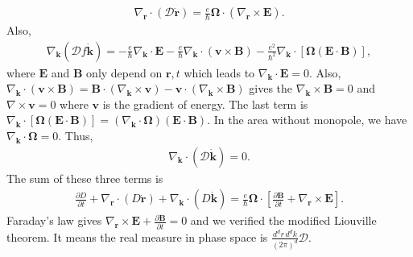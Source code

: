 \documentclass[12pt, oneside]{article}
\newcommand{\pa}{\partial}
\newcommand{\p}[1]{\left(#1\right)}
\newcommand{\bb}[1]{\left[#1\right]}
\numberwithin{equation}{subsection}
\begin{document}
\begin{align}
	\nabla_{\bm r}\cdot(\mathcal{D} \dot{\bm r}) = \frac{e}{\hbar} \bm\Omega\cdot(\nabla_{\bm r}\times\bm E).
\end{align}
Also, 
\begin{align}
	\nabla_{\bm{k}} \p{\mathcal{D} f \dot{\bm{k}}}  = - \frac{e}{\hbar} \nabla_{\bm{k}} \cdot \bm{E} - \frac{e}{\hbar}  \nabla_{\bm{k}} \cdot \p{\bm{v} \times \bm{B}} - \frac{e^2}{\hbar^2}  \nabla_{\bm{k}} \cdot \bb{\bm{\Omega} \p{\bm{E} \cdot \bm{B}}},
\end{align}
where \(\bm{E}\) and \(\bm{B}\) only depend on \(\bm{r}, t\) which leads to \(\nabla_{\bm{k}} \cdot \bm{E} = 0\). Also, \(\nabla_{\bm k}\cdot \p{\bm v\times\bm B} = \bm B\cdot \p{\nabla_{\bm k}\times\bm v} - \bm v\cdot \p{\nabla_{\bm k}\times\bm B}\) gives the \(\nabla_{\bm k}\times\bm B = 0\) and \(\nabla \times \bm{v} = 0\) where \(\bm{v}\) is the gradient of energy. The last term is \( \nabla_{\bm{k}} \cdot \bb{\bm{\Omega} \p{\bm{E} \cdot \bm{B}}} = \p{\nabla_{\bm{k}}  \cdot \bm{\Omega}}\p{\bm{E} \cdot \bm{B}}\). In the area without monopole, we have \(\nabla_{\bm{k}} \cdot \bm{\Omega} = 0\). Thus,
\begin{align}
	\nabla_{\bm{k}} \cdot \p{\mathcal{D} \dot{\bm{k}}} = 0.
\end{align}
The sum of these three terms is 
\begin{align}
	\frac{\pa D}{\pa t} + \nabla_{\bm{r}} \cdot \p{D \dot{\bm{r}}} +  \nabla_{\bm{k}} \cdot \p{D \dot{\bm{k}}} = \frac{e}{\hbar} \bm{\Omega} \cdot \bb{\frac{\partial \bm B}{\partial t} + \nabla_{\bm{r}} \times \bm{E}}.
\end{align}
Faraday's law gives \(\nabla_{\bm r}\times\bm E + \frac{\partial \bm B}{\partial t} =0\) and we verified the modified Liouville theorem. It means the real measure in phase space is \( \frac{d^d r\,d^d k}{\p{2 \pi}^{d}}\mathcal{D}\). 
\end{document}
